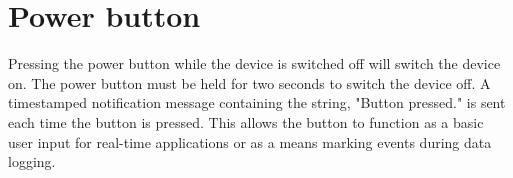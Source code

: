 \section{Power button}
\label{sec:powerButton}

Pressing the power button while the device is switched off will switch the device on.  The power button must be held for two seconds to switch the device off.  A timestamped notification message containing the string, "Button pressed." is sent each time the button is pressed.  This allows the button to function as a basic user input for real-time applications or as a means marking events during data logging.
